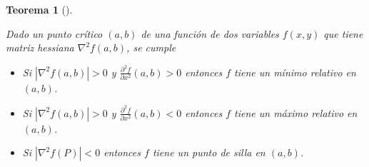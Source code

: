 \documentclass[
  a4paper,
]{scrreport}
\providecommand{\tightlist}{%
  \setlength{\itemsep}{0pt}\setlength{\parskip}{0pt}}\usepackage{longtable,booktabs,array}
\theoremstyle{definition}
\theoremstyle{definition}
\theoremstyle{definition}
\theoremstyle{plain}
\newtheorem{theorem}{Teorema}[chapter]
\theoremstyle{plain}
\theoremstyle{plain}
\theoremstyle{remark}
\begin{document}
\begin{theorem}[]\protect\hypertarget{thm-extremos-funcion-dos-variables}{}\label{thm-extremos-funcion-dos-variables}

Dado un punto crítico \((a, b)\) de una función de dos variables
\(f(x,y)\) que tiene matriz hessiana \(\nabla^2f(a,b)\), se cumple

\begin{itemize}
\tightlist
\item
  Si \(|\nabla^2 f(a,b)|>0\) y
  \(\frac{\partial^2 f}{\partial x^2}(a,b)>0\) entonces \(f\) tiene un
  \emph{mínimo relativo} en \((a,b)\).
\item
  Si \(|\nabla^2 f(a,b)|>0\) y
  \(\frac{\partial^2 f}{\partial x^2}(a,b)<0\) entonces \(f\) tiene un
  \emph{máximo relativo} en \((a,b)\).
\item
  Si \(|\nabla^2 f(P)|<0\) entonces \(f\) tiene un \emph{punto de silla}
  en \((a,b)\).
\end{itemize}

\end{theorem}
\end{document}
